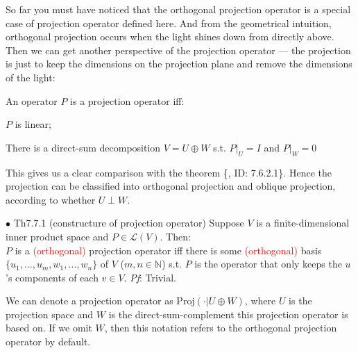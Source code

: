 \documentclass{article}
\begin{document}
\begin{Rmk}{}
    So far you must have noticed that \textcolor{Th}{the orthogonal projection operator is a special case of projection operator defined here.} And from the geometrical intuition, orthogonal projection occurs when the light shines down from directly above. Then we can get another perspective of the projection operator — the projection is just to keep the dimensions on the projection plane and remove the dimensions of the light:
    \textcolor{Th}{An operator $P$ is a projection operator iff:
    \begin{compactenum}
        \item $P$ is linear;
        \item There is a direct-sum decomposition $V = U\oplus W$ s.t. $P|_U = I$ and $P|_W = 0$
    \end{compactenum}    
    }
    This gives us a clear comparison with the theorem \{, ID: 7.6.2.1\}. Hence \textcolor{Df}{the projection can be classified into orthogonal projection and oblique projection, according to whether $U\perp W$.}
\end{Rmk}

\begin{Th}{$\bullet$ Th7.7.1 (constructure of projection operator)}
    Suppose $V$ is a finite-dimensional inner product space and $P\in\mathcal{L}(V)$. Then:\\
    $P$ is a \textcolor{red}{(orthogonal)} projection operator iff there is some \textcolor{red}{(orthogonal)} basis $\{u_1, \dots, u_m, w_1, \dots, w_n\}$ of $V$ ($m, n\in\mathbb{N}$) s.t. $P$ is the operator that only keeps the $u$'s components of each $v\in V$. 
    \tcblower
    \textit{Pf}: Trivial.
\end{Th}

\begin{Rmk}{}
    \textcolor{Df}{We can denote a projection operator as $\text{Proj}(\cdot|U\oplus W)$, where $U$ is the projection space and $W$ is the direct-sum-complement this projection operator is based on. If we omit $W$, then this notation refers to the orthogonal projection operator by default.} 
\end{Rmk}
\end{document}
